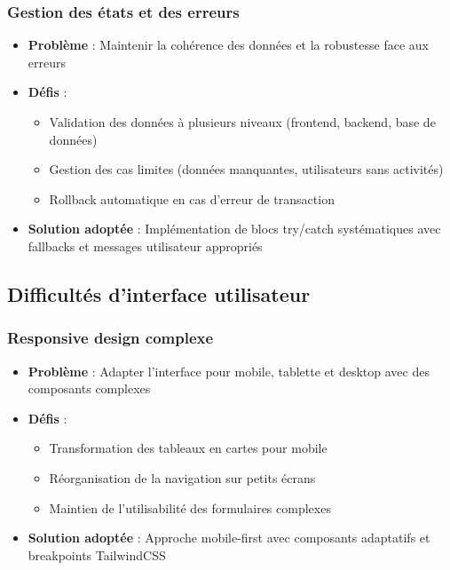 \documentclass[a4paper,11pt]{article}
\begin{document}
            \subsubsection{Gestion des états et des erreurs}
                \begin{itemize}
                    \item \textbf{Problème} : Maintenir la cohérence des données et la robustesse face aux erreurs
                    \item \textbf{Défis} :
                        \begin{itemize}
                            \item Validation des données à plusieurs niveaux (frontend, backend, base de données)
                            \item Gestion des cas limites (données manquantes, utilisateurs sans activités)
                            \item Rollback automatique en cas d'erreur de transaction
                        \end{itemize}
                    \item \textbf{Solution adoptée} : Implémentation de blocs try/catch systématiques avec fallbacks et messages utilisateur appropriés
                \end{itemize}

        \subsection{Difficultés d'interface utilisateur}

            \subsubsection{Responsive design complexe}
                \begin{itemize}
                    \item \textbf{Problème} : Adapter l'interface pour mobile, tablette et desktop avec des composants complexes
                    \item \textbf{Défis} :
                        \begin{itemize}
                            \item Transformation des tableaux en cartes pour mobile
                            \item Réorganisation de la navigation sur petits écrans
                            \item Maintien de l'utilisabilité des formulaires complexes
                        \end{itemize}
                    \item \textbf{Solution adoptée} : Approche mobile-first avec composants adaptatifs et breakpoints TailwindCSS
                \end{itemize}
\end{document}
